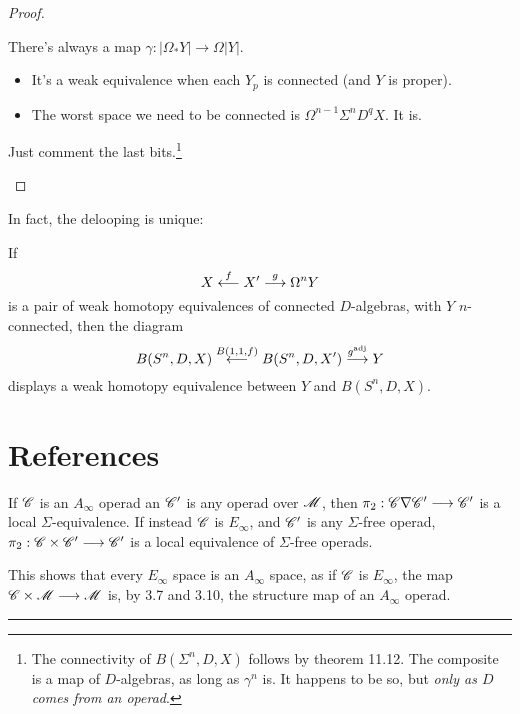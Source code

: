 \documentclass[11pt]{article}
\begin{document}
\begin{Operads}
\begin{proof}
\begin{itemise}
\item There's always a map $\gamma:|\Omega_*Y|\to\Omega|Y|$.
\begin{itemize}\squishlist
\item It's a weak equivalence when each $Y_p$ is connected (and $Y$ is proper).
\item The worst space we need to be connected is $\Omega^{n-1}\Sigma^nD^qX$. It is.
\end{itemize}
\item Just comment the last bits.\footnote{The connectivity of $B(\Sigma^n,D,X)$ follows by theorem 11.12. The composite is a map of $D$-algebras, as long as $\gamma^n$ is. It happens to be so, but \emph{only as $D$ comes from an operad}.}\qedhere
\end{itemise}
\end{proof}
In fact, the delooping is unique:
\begin{cor*}
If
\[X\overset{f}{\longleftarrow}X'\overset{g}{\longrightarrow}\Omega^nY\]
 is a pair of weak homotopy equivalences of connected $D$-algebras, with $Y$ $n$-connected, then the diagram
\[B(S^n,D,X)\overset{B(1,1,f)}{\longleftarrow}B(S^n,D,X')\overset{g^{\textup{adj}}}{\longrightarrow}Y\]
displays a weak homotopy equivalence between $Y$ and $B(S^n,D,X)$.
\end{cor*}

\pagebreak
\section*{References}
\begin{prop*}[3.10]
If $\mathscr{C}$ is an $A_\infty$ operad an $\mathscr{C}'$ is any operad over $\mathscr{M}$, then
$\pi_2:\mathscr{C}\nabla\mathscr{C}'\longrightarrow\mathscr{C}'$ is a local $\Sigma$-equivalence. If instead
$\mathscr{C}$ is $E_\infty$, and $\mathscr{C}'$ is any $\Sigma$-free operad,
$\pi_2:\mathscr{C}\times\mathscr{C}'\longrightarrow\mathscr{C}'$ is a local equivalence of $\Sigma$-free
operads.
\end{prop*}\noindent
This shows that every $E_\infty$ space is an $A_\infty$ space, as if $\mathscr{C}$
is $E_\infty$, the map $\mathscr{C}\times\mathscr{M}\longrightarrow\mathscr{M}$ is, by 3.7 and 3.10,
the structure map of an $A_\infty$ operad. 

\hrule


\end{Operads}
\end{document}

